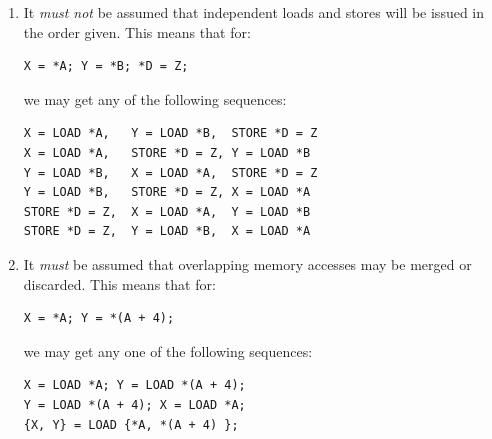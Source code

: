 \begin{enumerate}
\item	It \emph{must not} be assumed that independent loads and stores will
	be issued in the order given.  This means that for:

\vspace{5pt}
\begin{minipage}[t]{\columnwidth}
\small
\begin{verbatim}
X = *A; Y = *B; *D = Z;
\end{verbatim}
\end{minipage}
\vspace{5pt}

	we may get any of the following sequences:


\vspace{5pt}
\begin{minipage}[t]{\columnwidth}
\small
\begin{verbatim}
X = LOAD *A,   Y = LOAD *B,  STORE *D = Z
X = LOAD *A,   STORE *D = Z, Y = LOAD *B
Y = LOAD *B,   X = LOAD *A,  STORE *D = Z
Y = LOAD *B,   STORE *D = Z, X = LOAD *A
STORE *D = Z,  X = LOAD *A,  Y = LOAD *B
STORE *D = Z,  Y = LOAD *B,  X = LOAD *A
\end{verbatim}
\end{minipage}
\vspace{5pt}

\item	It \emph{must} be assumed that overlapping memory accesses may
	be merged or discarded.  This means that for:

\vspace{5pt}
\begin{minipage}[t]{\columnwidth}
\small
\begin{verbatim}
X = *A; Y = *(A + 4);
\end{verbatim}
\end{minipage}
\vspace{5pt}

	we may get any one of the following sequences:

\vspace{5pt}
\begin{minipage}[t]{\columnwidth}
\small
\begin{verbatim}
X = LOAD *A; Y = LOAD *(A + 4);
Y = LOAD *(A + 4); X = LOAD *A;
{X, Y} = LOAD {*A, *(A + 4) };
\end{verbatim}
\end{minipage}
\vspace{5pt}


\end{enumerate}
